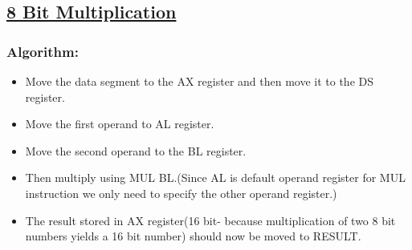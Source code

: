 \documentclass[12pt,a4paper]{article}
\begin{document}
\begin{flushleft}
\newpage
\subsection*{\textbf{\underline{8 Bit Multiplication}}}

\subsubsection*{\textbf{Algorithm:}}
\begin{itemize}
    \item Move the data segment to the AX register and then move it to the DS register.
    \item Move the first operand to AL register.
\item  Move the second operand to the BL register.
\item  Then multiply using MUL BL.(Since AL is default operand register for MUL instruction we only need to specify the other operand register.)
\item  The result stored in AX register(16 bit- because multiplication of two 8 bit numbers yields a 16 bit number) should now be moved to
RESULT.
\end{itemize}


\end{flushleft}
\end{document}
